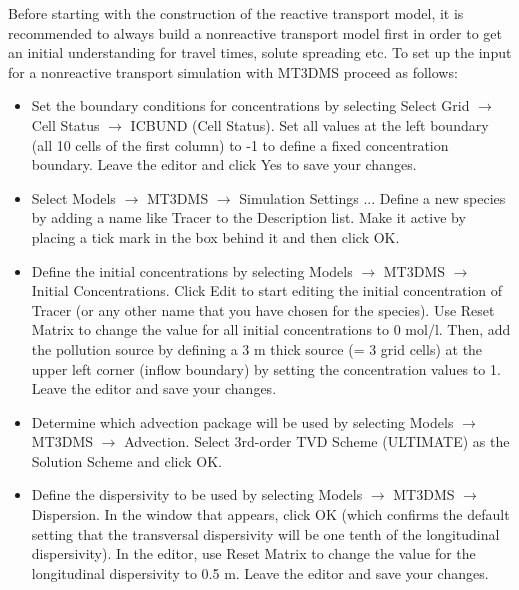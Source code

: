 Before starting with the construction of the reactive transport model, it is recommended to always 
build a nonreactive transport model first in order to get an initial understanding for travel times, solute spreading etc. To set up the input for a nonreactive transport simulation with
MT3DMS proceed as follows:

\begin{itemize}

\item Set the boundary conditions for concentrations by selecting Select Grid $\rightarrow$ Cell Status $\rightarrow$ ICBUND (Cell Status). Set all values at the left boundary (all 10 cells of the first column) to -1 to define a fixed concentration boundary. Leave the editor and click Yes to save your changes.

\item Select Models $\rightarrow$ MT3DMS $\rightarrow$ Simulation Settings ... Define a new species by adding a name like Tracer to the Description list. Make it active by placing a tick mark in the box behind it and then click OK.

\item Define the initial concentrations by selecting Models $\rightarrow$ MT3DMS $\rightarrow$ Initial Concentrations. Click Edit to start editing the initial concentration of Tracer (or any other name that you have chosen for the species). Use  Reset Matrix to change the value for all initial concentrations to 0 mol/l. Then, add the pollution source by defining a 3 m thick source (= 3 grid cells) at the upper left corner (inflow boundary) by setting the concentration values to 1. Leave the editor and save your changes.

\item Determine which advection package will be used by selecting Models $\rightarrow$ MT3DMS $\rightarrow$ Advection. Select 3rd-order TVD Scheme (ULTIMATE) as the Solution Scheme and click OK.

\item Define the dispersivity to be used by selecting Models $\rightarrow$ MT3DMS $\rightarrow$ Dispersion. In the window that appears, click OK (which confirms the default setting that the transversal dispersivity will be one tenth of the longitudinal dispersivity). In the editor, use Reset Matrix to change the value for the longitudinal dispersivity to 0.5 m. Leave the editor and save your changes.



\end{itemize}
